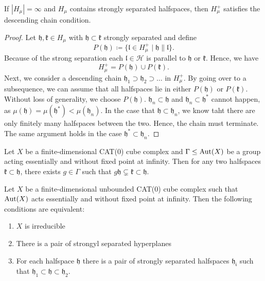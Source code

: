 \begin{lemma}[{\cite[Lemma~4.18]{MR3509968}}]
  \label{lem:4.18}
  If \(|H_\mu| = \infty\) and \(H_\mu\) contains strongly separated halfspaces, then \(H_\mu^+\) satisfies the descending chain condition.
\end{lemma}

\begin{proof}
  Let \(\mathfrak{h, k} \in H_\mu\) with \(\mathfrak{h} \subset \mathfrak{k}\) strongly separated and define
  \[
    P(\mathfrak{h}) \coloneqq \{\mathfrak{l} \in H_\mu^+ \mid \mathfrak{h} \parallel \mathfrak{l}\}.
  \]
  Because of the strong separation each \(\mathfrak{l} \in \mathcal{H}\) is parallel to \(\mathfrak{h}\) or \(\mathfrak{k}\). Hence, we have
  \[
    H_\mu^+ = P(\mathfrak{h}) \cup P(\mathfrak{k}).
  \]
  Next, we consider a descending chain \(\mathfrak{h_1} \supset \mathfrak{h_2} \supset \dots\) in \(H_\mu^+\). By going over to a subsequence, we can assume that all halfspaces lie in either \(P(\mathfrak{h})\) or \(P(\mathfrak{k})\). Without loss of generality, we choose \(P(\mathfrak{h})\). \(\mathfrak{h}_n \subset \mathfrak{h}\) and \(\mathfrak{h}_n \subset \mathfrak{h}^\ast\) cannot happen, as \(\mu(\mathfrak{h}) = \mu(\mathfrak{h}^\ast) < \mu(\mathfrak{h}_n)\). In the case that \(\mathfrak{h} \subset \mathfrak{h}_n\), we know taht there are only finitely many halfspaces between the two. Hence, the chain must terminate. The same argument holds in the case \(\mathfrak{h}^\ast \subset \mathfrak{h}_n\).
\end{proof}

\begin{lemma}
  \label{lem:cs-dsl}
  Let \(X\) be a finite-dimensional CAT(0) cube complex and \(\Gamma \leq \operatorname{Aut}(X)\) be a group acting essentially and without fixed point at infinity. Then for any two halfspaces \(\mathfrak{k} \subset \mathfrak{h}\), there exists \(g \in \Gamma\) such that \(g \mathfrak{h} \subsetneq \mathfrak{k} \subset \mathfrak{h}\).
\end{lemma}

\begin{prop}
  \label{prop:cs-5.1}
  Let \(X\) be a finite-dimensional unbounded CAT(0) cube complex such that \(\operatorname{Aut}(X)\) acts essentially and without fixed point at infinity. Then the following conditions are equivalent:
  \begin{enumerate}
  \item \(X\) is irreducible
  \item There is a pair of strongyl separated hyperplanes
  \item For each halfspace \(\mathfrak{h}\) there is a pair of strongly separated halfspaces \(\mathfrak{h_i}\) such that \(\mathfrak{h}_1 \subset \mathfrak{h} \subset \mathfrak{h}_2\).
  \end{enumerate}
\end{prop}


